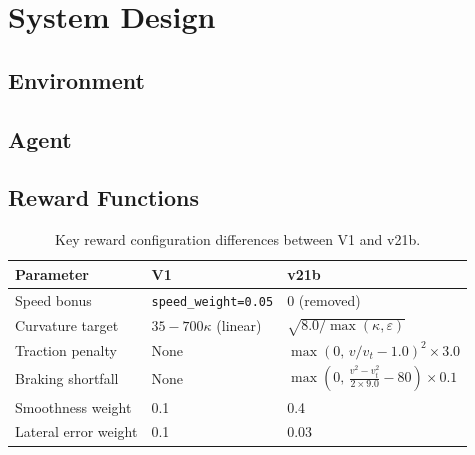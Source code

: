 \section{System Design}
\label{sec:system_design}


\subsection{Environment}

\subsection{Agent}

\subsection{Reward Functions}

\begin{table}[h]
\centering
\caption{Key reward configuration differences between V1 and v21b.}
\label{tab:reward_configs}
\begin{tabular}{lll}
\toprule
Parameter & V1 & v21b \\
\midrule
Speed bonus       & \texttt{speed\_weight=0.05} & 0 (removed) \\
Curvature target  & $35 - 700\kappa$ (linear)   & $\sqrt{8.0 / \max(\kappa, \varepsilon)}$ \\
Traction penalty  & None                        & $\max(0,\, v/v_t - 1.0)^2 \times 3.0$ \\
Braking shortfall & None                        & $\max(0,\, \frac{v^2 - v_t^2}{2 \times 9.0} - 80) \times 0.1$ \\
Smoothness weight & 0.1                         & 0.4 \\
Lateral error weight & 0.1                      & 0.03 \\
\bottomrule
\end{tabular}
\end{table}

